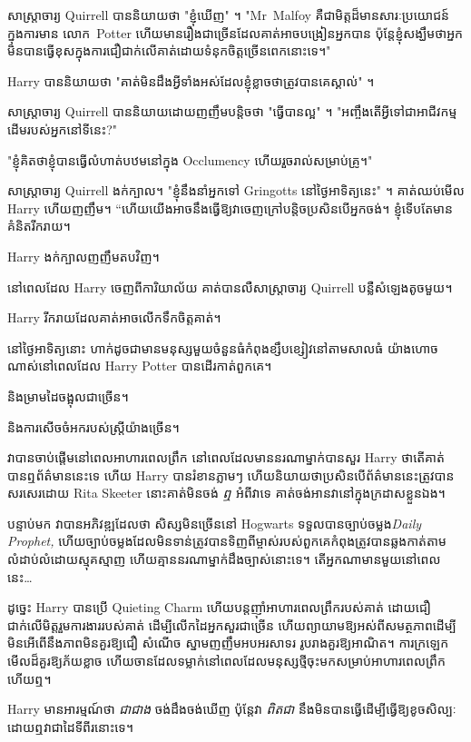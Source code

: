 សាស្រ្តាចារ្យ Quirrell បាននិយាយថា "ខ្ញុំឃើញ" ។ "Mr~Malfoy គឺជាមិត្តដ៏មានសារៈប្រយោជន៍ក្នុងការមាន លោក~Potter ហើយមានរឿងជាច្រើនដែលគាត់អាចបង្រៀនអ្នកបាន ប៉ុន្តែខ្ញុំសង្ឃឹមថាអ្នកមិនបានធ្វើខុសក្នុងការជឿជាក់លើគាត់ដោយទំនុកចិត្តច្រើនពេកនោះទេ។"

Harry បាននិយាយថា "គាត់មិនដឹងអ្វីទាំងអស់ដែលខ្ញុំខ្លាចថាត្រូវបានគេស្គាល់" ។

សាស្រ្តាចារ្យ Quirrell បាននិយាយដោយញញឹមបន្តិចថា "ធ្វើបានល្អ" ។ "អញ្ចឹងតើអ្វីទៅជាអាជីវកម្មដើមរបស់អ្នកនៅទីនេះ?"

"ខ្ញុំគិតថាខ្ញុំបានធ្វើលំហាត់បឋមនៅក្នុង Occlumency ហើយរួចរាល់សម្រាប់គ្រូ។"

សាស្ត្រាចារ្យ Quirrell ងក់ក្បាល។ "ខ្ញុំនឹងនាំអ្នកទៅ Gringotts នៅថ្ងៃអាទិត្យនេះ" ។ គាត់​ឈប់​មើល Harry ហើយ​ញញឹម។ “ហើយ​យើង​អាច​នឹង​ធ្វើ​ឱ្យ​វា​ចេញ​ក្រៅ​បន្តិច​ប្រសិន​បើ​អ្នក​ចង់។ ខ្ញុំទើបតែមានគំនិតរីករាយ។

Harry ងក់ក្បាលញញឹមតបវិញ។

នៅពេលដែល Harry ចេញពីការិយាល័យ គាត់បានលឺសាស្រ្តាចារ្យ Quirrell បន្លឺសំឡេងតូចមួយ។

Harry រីករាយដែលគាត់អាចលើកទឹកចិត្តគាត់។

\later

នៅថ្ងៃអាទិត្យនោះ ហាក់ដូចជាមានមនុស្សមួយចំនួនធំកំពុងខ្សឹបខ្សៀវនៅតាមសាលធំ យ៉ាងហោចណាស់នៅពេលដែល Harry Potter បានដើរកាត់ពួកគេ។

និងម្រាមដៃចង្អុលជាច្រើន។

និងការសើចចំអករបស់ស្ត្រីយ៉ាងច្រើន។

វាបានចាប់ផ្តើមនៅពេលអាហារពេលព្រឹក នៅពេលដែលមាននរណាម្នាក់បានសួរ Harry ថាតើគាត់បានឮព័ត៌មាននេះទេ ហើយ Harry បានរំខានភ្លាមៗ ហើយនិយាយថាប្រសិនបើព័ត៌មាននេះត្រូវបានសរសេរដោយ Rita Skeeter នោះគាត់មិនចង់ \emph{ឮ} អំពីវាទេ គាត់ចង់អានវានៅក្នុងក្រដាសខ្លួនឯង។

បន្ទាប់មក វាបានអភិវឌ្ឍដែលថា សិស្សមិនច្រើននៅ Hogwarts ទទួលបានច្បាប់ចម្លង\emph{Daily Prophet,} ហើយច្បាប់ចម្លងដែលមិនទាន់ត្រូវបានទិញពីម្ចាស់របស់ពួកគេកំពុងត្រូវបានឆ្លងកាត់តាមលំដាប់លំដោយស្មុគស្មាញ ហើយគ្មាននរណាម្នាក់ដឹងច្បាស់នោះទេ។ តើអ្នកណាមានមួយនៅពេលនេះ…

ដូច្នេះ Harry បានប្រើ Quieting Charm ហើយបន្តញ៉ាំអាហារពេលព្រឹករបស់គាត់ ដោយជឿជាក់លើមិត្តរួមការងាររបស់គាត់ ដើម្បីលើកដៃអ្នកសួរជាច្រើន ហើយព្យាយាមឱ្យអស់ពីសមត្ថភាពដើម្បីមិនអើពើនឹងភាពមិនគួរឱ្យជឿ សំណើច ស្នាមញញឹមអបអរសាទរ រូបរាងគួរឱ្យអាណិត។ ការក្រឡេកមើលដ៏គួរឱ្យភ័យខ្លាច ហើយចានដែលទម្លាក់នៅពេលដែលមនុស្សថ្មីចុះមកសម្រាប់អាហារពេលព្រឹក ហើយឮ។

Harry មានអារម្មណ៍ថា \emph{ជាជាង} ចង់ដឹងចង់ឃើញ ប៉ុន្តែវា \emph{ពិតជា} នឹងមិនបានធ្វើដើម្បីធ្វើឱ្យខូចសិល្បៈដោយឮវាជាដៃទីពីរនោះទេ។

